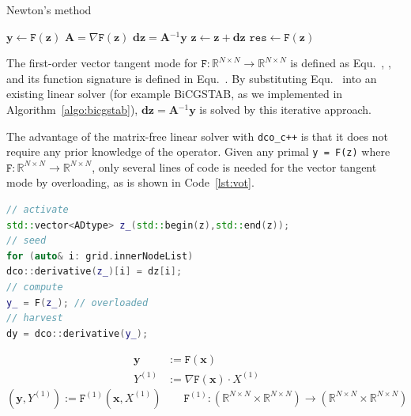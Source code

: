 \documentclass[11pt]{scrartcl}
\newcommand{\inv}{\ensuremath{^{-1}}}
\newcommand{\vect}[1]{\boldsymbol{#1}}
\newcommand{\rb}[1]{\left( #1 \right)}
\begin{document}
\begin{algorithm}[H]
	\caption{Newton's method}\label{algo:matfree-newton}
	\begin{algorithmic}
		\State $\vect{y} \gets \mathtt{F}(\vect{z})$ 
		\While{$\lVert \vect{y} \rVert > \textsc{tol}$} 
		\State $\vect{A} = \nabla \mathtt{F}(\vect{z})$ 
		\State \color{blue} $\vect{dz} = \vect{A}\inv \vect{y}$  \normalcolor {}
		\State $\vect{z} \gets \vect{z} + \vect{dz}$
		\State $\mathtt{res} \gets \mathtt{F}(\vect{z})$ 
		\EndWhile
	\end{algorithmic}
\end{algorithm}

The first-order vector tangent mode for $\mathtt{F}: \mathbb{R}^{N\times N}\rightarrow \mathbb{R}^{N\times N} $ is defined as Equ.~, , and its function signature is defined in Equ.~. By substituting Equ.~ into an existing linear solver (for example BiCGSTAB, as we implemented in Algorithm~\ref{algo:bicgstab}), $\vect{dz} = \vect{A}\inv \vect{y}$ is solved by this iterative approach.

The advantage of the matrix-free linear solver with \texttt{dco\_c++} is that it does not require any prior knowledge of the operator. Given any primal \texttt{y = F(z)} where $ \mathtt{F}: \mathbb{R}^{N\times N}\rightarrow \mathbb{R}^{N\times N} $, only several lines of code is needed for the vector tangent mode by overloading, as is shown in Code~\ref{lst:vot}.
\begin{lstlisting}[caption={Vectors of Tangents by Overloading},label=lst:vot,language=C++]
// activate
std::vector<ADtype> z_(std::begin(z),std::end(z));
// seed
for (auto& i: grid.innerNodeList) 
dco::derivative(z_)[i] = dz[i];
// compute
y_ = F(z_); // overloaded
// harvest
dy = dco::derivative(y_);
\end{lstlisting}

\begin{align}
\textbf{y} &:= \mathtt{F}(\textbf{x})\label{eq:tg1} &&
\\
Y^{(1)} &:= \nabla \mathtt{F}(\textbf{x}) \cdot X^{(1)}\label{eq:tg2}
\end{align}
\begin{equation}
\rb{\textbf{y}, Y^{(1)}} := \mathtt{F}^{(1)}\rb{\textbf{x}, X^{(1)}}\qquad \mathtt{F}^{(1)}: \rb{\mathbb{R}^{N\times N}\times \mathbb{R}^{N\times N}}\rightarrow \rb{\mathbb{R}^{N\times N}\times\mathbb{R}^{N\times N}}\label{eq:tg}
\end{equation}
\end{document}
